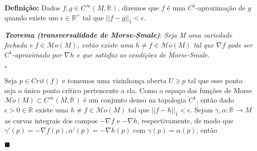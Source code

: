 \documentclass[12pt]{book}
\newcommand{\real}[1]{\mathbb{R}^{#1}}
\newcommand{\definicao}[1]{\vspace{2mm} \textbf{Definição:}{ #1}}
\newcommand{\tese}[3]{\vspace{2mm} \textit{\textbf{#1}}: \textit{#2} \par $\square$ #3 \par $\blacksquare$}
\newcommand{\morsefunc}[1]{\mathcal{M}o(#1)}
\newcommand{\pontocritico}[1]{\textit{Crit}(#1)}
\newcommand{\suavefunc}[1]{C^{\infty}(#1, \real{})}
\begin{document}
	\definicao{Dados $f, g \in \suavefunc{M}$, dizemos que $f$ é uma $C^{1}$-aproximação de $g$ quando existe um $\epsilon \in \real{+}$ tal que $||f-g||_{1} < \epsilon$.}
	
	\tese{Teorema (transversalidade de Morse-Smale)}{Seja M uma variedade fechada e $f \in \morsefunc{M}$, então existe uma $h \neq f \in \morsefunc{M}$ tal que $\nabla f$ pode ser $C^{1}$-aproximado por $\nabla h$ e que satisfaz as condições de Morse-Smale.}{
		
	Seja $p \in \pontocritico{f}$ e tomemos uma vizinhança aberta $U \ni p$ tal que esse ponto seja o único ponto crítico pertencente a ela. Como o espaço das funções de Morse $\morsefunc{M} \subset C^{\infty}(M, \real{})$ é um conjunto denso na topologia $C^{1}$, então dado $\epsilon > 0 \in \real{}$ existe uma $h \neq f \in \morsefunc{M}$ tal que $||f-h||_{1} < \epsilon$. Sejam $\gamma, \alpha : \real{} \to M$ as curvas integrais dos campos $-\nabla f$ e $-\nabla h$, respectivamente, de modo que $\gamma'(p) = -\nabla f(p), \alpha'(p) = -\nabla h(p)$ com $\gamma(p) = \alpha(p)$, então }
\end{document}
